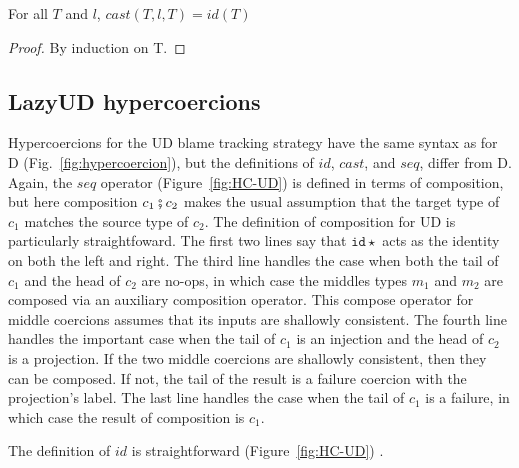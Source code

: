 \documentclass[acmsmall,review,anonymous]{acmart}\settopmatter{printfolios=true,printccs=false,printacmref=false}
\newcommand{\figref}[1]{Fig.~\ref{#1}}
\newcommand{\lazyUD}{Lazy\;UD}
\newcommand{\lazyD}{Lazy\;D}
\newcommand{\hyperCoercionI}[0]{\mathtt{id\star}}
\begin{document}
\begin{proposition}[\lazyD{} Identity Casts]
  For all $T$ and $l$, $cast(T,l,T) = id(T) $
\end{proposition}
\begin{proof}
  By induction on T.
\end{proof}

\subsection{\lazyUD{} hypercoercions}
\label{sec:lud-hc}

Hypercoercions for the UD blame tracking strategy have the same syntax
as for D (\figref{fig:hypercoercion}), but the definitions of $id$,
$cast$, and $seq$, differ from D.  Again, the $seq$ operator
(Figure~\ref{fig:HC-UD}) is defined in terms of composition, but here
composition $c_1 \fatsemi c_2$ makes the usual assumption that the
target type of $c_1$ matches the source type of $c_2$.  The definition
of composition for UD is particularly straightfoward. The first two
lines say that $\hyperCoercionI$ acts as the identity on both the left
and right. The third line handles the case when both the tail of $c_1$
and the head of $c_2$ are no-ops, in which case the middles types
$m_1$ and $m_2$ are composed via an auxiliary composition
operator. This compose operator for middle coercions assumes that its
inputs are shallowly consistent.  The fourth line handles the
important case when the tail of $c_1$ is an injection and the head of
$c_2$ is a projection. If the two middle coercions are shallowly
consistent, then they can be composed. If not, the tail of the result
is a failure coercion with the projection's label.  The last line
handles the case when the tail of $c_1$ is a failure, in which case
the result of composition is $c_1$.


The definition of $id$ is straightforward (Figure~\ref{fig:HC-UD}) .
\end{document}
